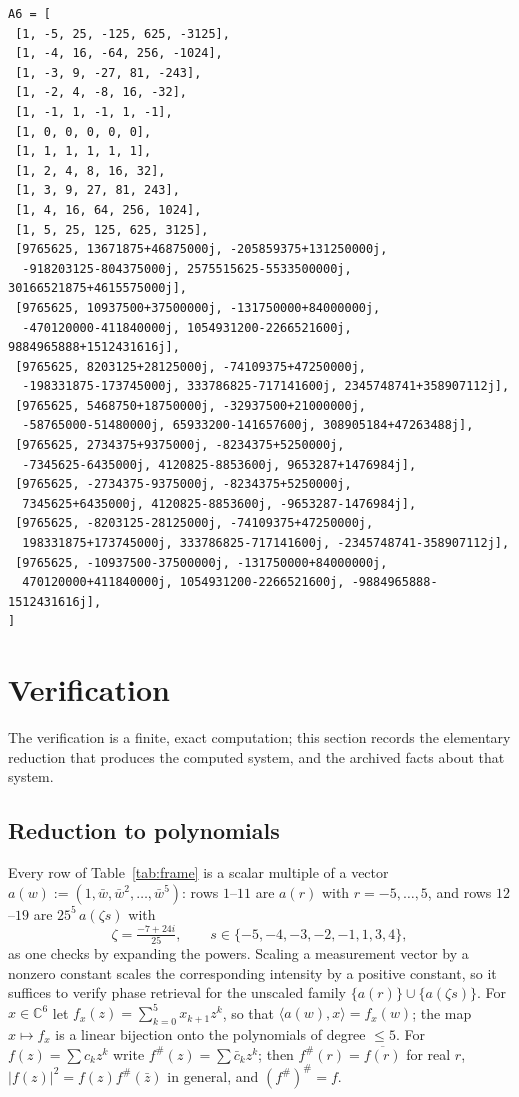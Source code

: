 \documentclass[10pt]{amsart}
\newcommand{\C}{\mathbb C}
\begin{document}
\begin{table}[h]
{\scriptsize
\begin{verbatim}
A6 = [
 [1, -5, 25, -125, 625, -3125],
 [1, -4, 16, -64, 256, -1024],
 [1, -3, 9, -27, 81, -243],
 [1, -2, 4, -8, 16, -32],
 [1, -1, 1, -1, 1, -1],
 [1, 0, 0, 0, 0, 0],
 [1, 1, 1, 1, 1, 1],
 [1, 2, 4, 8, 16, 32],
 [1, 3, 9, 27, 81, 243],
 [1, 4, 16, 64, 256, 1024],
 [1, 5, 25, 125, 625, 3125],
 [9765625, 13671875+46875000j, -205859375+131250000j,
  -918203125-804375000j, 2575515625-5533500000j, 30166521875+4615575000j],
 [9765625, 10937500+37500000j, -131750000+84000000j,
  -470120000-411840000j, 1054931200-2266521600j, 9884965888+1512431616j],
 [9765625, 8203125+28125000j, -74109375+47250000j,
  -198331875-173745000j, 333786825-717141600j, 2345748741+358907112j],
 [9765625, 5468750+18750000j, -32937500+21000000j,
  -58765000-51480000j, 65933200-141657600j, 308905184+47263488j],
 [9765625, 2734375+9375000j, -8234375+5250000j,
  -7345625-6435000j, 4120825-8853600j, 9653287+1476984j],
 [9765625, -2734375-9375000j, -8234375+5250000j,
  7345625+6435000j, 4120825-8853600j, -9653287-1476984j],
 [9765625, -8203125-28125000j, -74109375+47250000j,
  198331875+173745000j, 333786825-717141600j, -2345748741-358907112j],
 [9765625, -10937500-37500000j, -131750000+84000000j,
  470120000+411840000j, 1054931200-2266521600j, -9884965888-1512431616j],
]
\end{verbatim}}
\caption{The nineteen measurement vectors $a_1,\dots,a_{19}$ for
$\C^6$ (rows; $\mathtt j=\sqrt{-1}$).}\label{tab:frame}
\end{table}

\section{Verification}\label{sec:verification}

The verification is a finite, exact computation; this section records
the elementary reduction that produces the computed system, and the
archived facts about that system.

\subsection*{Reduction to polynomials}
Every row of Table~\ref{tab:frame} is a scalar multiple of a vector
$a(w):=(1,\bar w,\bar w^2,\dots,\bar w^5)$: rows $1$--$11$ are $a(r)$
with $r=-5,\dots,5$, and rows $12$--$19$ are $25^5\,a(\zeta s)$ with
\[
\zeta=\tfrac{-7+24i}{25},\qquad s\in\{-5,-4,-3,-2,-1,1,3,4\},
\]
as one checks by expanding the powers. Scaling a measurement vector by
a nonzero constant scales the corresponding intensity by a positive
constant, so it suffices to verify phase retrieval for the unscaled
family $\{a(r)\}\cup\{a(\zeta s)\}$. For $x\in\C^6$ let
$f_x(z)=\sum_{k=0}^{5}x_{k+1}z^k$, so that $\langle
a(w),x\rangle=f_x(w)$; the map $x\mapsto f_x$ is a linear bijection
onto the polynomials of degree $\le5$. For $f(z)=\sum c_kz^k$ write
$f^{\#}(z)=\sum\bar c_kz^k$; then $f^{\#}(r)=\overline{f(r)}$ for real
$r$, $|f(z)|^2=f(z)f^{\#}(\bar z)$ in general, and $(f^{\#})^{\#}=f$.
\end{document}
